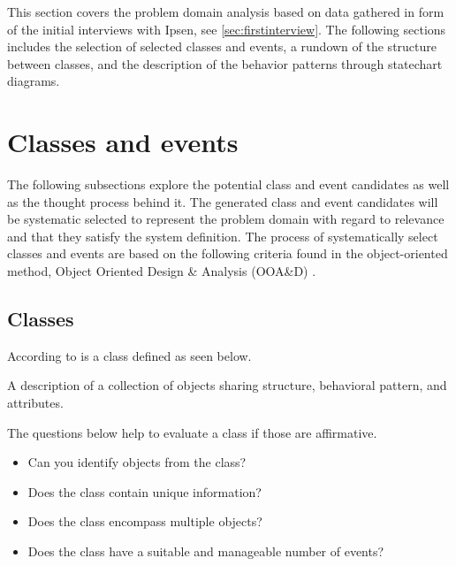 This section covers the problem domain analysis based on data gathered in form of the initial interviews with Ipsen, see \cref{sec:firstinterview}.
The following sections includes the selection of selected classes and events, a rundown of the structure between classes, and the description of the behavior patterns through statechart diagrams.

\section{Classes and events}
The following subsections explore the potential class and event candidates as well as the thought process behind it.
The generated class and event candidates will be systematic selected to represent the problem domain with regard to relevance and that they satisfy the system definition.
The process of systematically select classes and events are based on the following criteria found in the object-oriented method, Object Oriented Design \& Analysis (OOA\&D) \cite{Rod-Aalborg} .

\subsection{Classes} \label{sec:Classes}
According to  \citep[p.~55]{Rod-Aalborg} is a class defined as seen below.
\begin{defn}\label{defn:class}
	A description of a collection of objects sharing structure, behavioral pattern, and attributes.	
\end{defn}


The questions below help to evaluate a class if those are affirmative. \citep[p.~62]{Rod-Aalborg}
\begin{itemize}
	\item Can you identify objects from the class?
	\item Does the class contain unique information?
	\item Does the class encompass multiple objects?
	\item Does the class have a suitable and manageable number of events?
\end{itemize}

